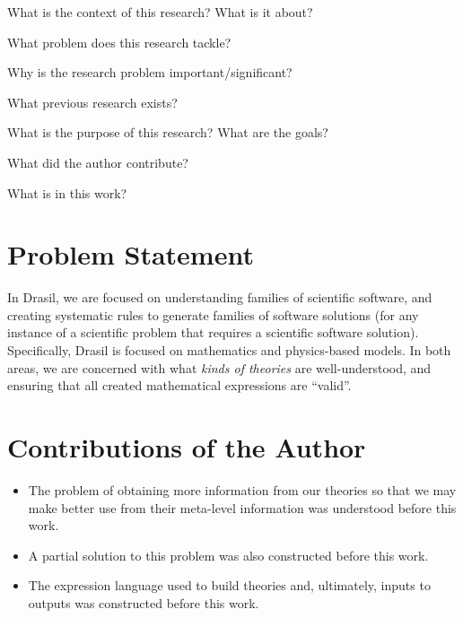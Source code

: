 \begin{writingquestions}
      \item What is the context of this research? What is it about?
      \item What problem does this research tackle?
      \item Why is the research problem important/significant?
      \item What previous research exists?
      \item What is the purpose of this research? What are the goals?
      \item What did the author contribute? 
      \item What is in this work? 
\end{writingquestions}


\section{Problem Statement}
\label{sec:intro:problemStatement}

In Drasil, we are focused on understanding families of scientific software, and
creating systematic rules to generate families of software solutions (for any
instance of a scientific problem that requires a scientific software solution).
Specifically, Drasil is focused on mathematics and physics-based models. In both
areas, we are concerned with what \textit{kinds of theories} are
well-understood, and ensuring that all created mathematical expressions are
``valid''.


\section{Contributions of the Author}
\label{sec:intro:contributions}

\begin{itemize}
      \item The problem of obtaining more information from our theories so that we
            may make better use from their meta-level information was understood
            before this work.
      \item A partial solution to this problem was also constructed before this
            work.
      \item The expression language used to build theories and, ultimately, inputs
            to outputs was constructed before this work.
\end{itemize}

